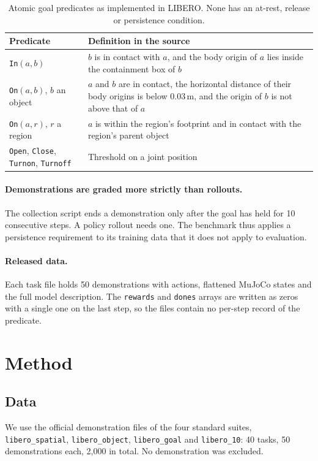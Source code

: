 \documentclass[10pt,twocolumn]{article}
\newcommand{\pred}[1]{\texttt{#1}}
\newcommand{\suite}[1]{\texttt{#1}}
\begin{document}
\begin{table}[t]
\centering\small
\caption{Atomic goal predicates as implemented in LIBERO. None has an at-rest, release or persistence condition.}
\label{tab:predicates}
\begin{tabularx}{\columnwidth}{@{}lX@{}}
\toprule
Predicate & Definition in the source \\
\midrule
\pred{In}$(a,b)$ & $b$ is in contact with $a$, and the body origin of $a$ lies inside the containment box of $b$ \\
\pred{On}$(a,b)$, $b$ an object & $a$ and $b$ are in contact, the horizontal distance of their body origins is below 0.03\,m, and the origin of $b$ is not above that of $a$ \\
\pred{On}$(a,r)$, $r$ a region & $a$ is within the region's footprint and in contact with the region's parent object \\
\pred{Open}, \pred{Close}, \pred{Turnon}, \pred{Turnoff} & Threshold on a joint position \\
\bottomrule
\end{tabularx}
\end{table}

\paragraph{Demonstrations are graded more strictly than rollouts.} The collection script ends a demonstration only after the goal has held for 10 consecutive steps. A policy rollout needs one. The benchmark thus applies a persistence requirement to its training data that it does not apply to evaluation.

\paragraph{Released data.} Each task file holds 50 demonstrations with actions, flattened MuJoCo states and the full model description. The \texttt{rewards} and \texttt{dones} arrays are written as zeros with a single one on the last step, so the files contain no per-step record of the predicate.

\section{Method}

\subsection{Data}
We use the official demonstration files of the four standard suites, \suite{libero\_spatial}, \suite{libero\_object}, \suite{libero\_goal} and \suite{libero\_10}: 40 tasks, 50 demonstrations each, 2{,}000 in total. No demonstration was excluded.
\end{document}
